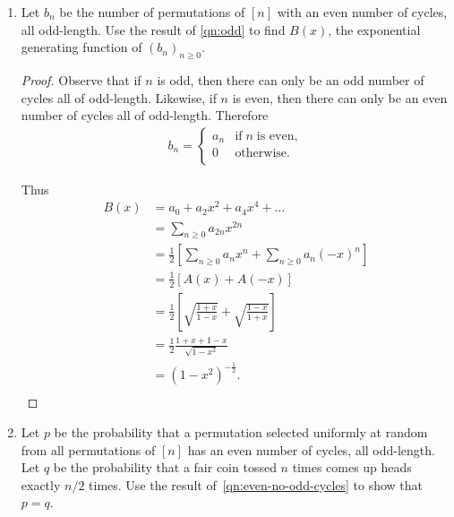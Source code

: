 \documentclass{article}
\begin{document}
\begin{enumerate}[label={(\alph*)}]
\begin{proof}
        Then
        \[A(x) =\exp{\left(C(x)\right)}
        =\exp{\left(\ln{\sqrt{\frac{1+x}{1-x}}}\right)}
        =\sqrt{\frac{1+x}{1-x}}.\]
      \end{proof}

    \item \label{qn:even-no-odd-cycles}
      Let $b_n$ be the number of permutations of $[n]$ with an even
      number of cycles, all odd-length. Use the result of
      \ref{qn:odd} to find $B(x)$, the exponential generating function
      of $(b_n)_{n\geq0}$.

      \begin{proof}
        Observe that if $n$ is odd, then there can only be an odd number
        of cycles all of odd-length. Likewise, if $n$ is even, then there
        can only be an even number of cycles all of odd-length. Therefore
        \begin{align*}
          b_n =
          \begin{cases}
            a_n &\text{if}\; n\; \text{is even},\\
            0 &\text{otherwise}.\\
          \end{cases}
        \end{align*}

        Thus
        \begin{align*}
          B(x) &=a_0+a_2x^2+a_4x^4+\ldots\\
          &=\sum_{n\geq0} a_{2n}x^{2n}\\
          &=\frac{1}{2} \left[\sum_{n\geq0} a_{n}x^{n} + \sum_{n\geq0}
            a_{n}(-x)^{n}\right]\\
          &=\frac{1}{2} \left[A(x) + A(-x)\right]\\
          &=\frac{1}{2} \left[\sqrt{\frac{1+x}{1-x}} +
            \sqrt{\frac{1-x}{1+x}}\right]\\
          &=\frac{1}{2} \frac{1+x+1-x}{\sqrt{1-x^2}}\\
          &=(1-x^2)^{-\frac{1}{2}}.\\
        \end{align*}
      \end{proof}

    \item Let $p$ be the probability that a permutation selected
      uniformly at random from all permutations of $[n]$ has an even
      number of cycles, all odd-length. Let $q$ be the probability that a
      fair coin tossed $n$ times comes up heads exactly $n/2$ times. Use
      the result of~\ref{qn:even-no-odd-cycles} to show that $p=q$.


\end{enumerate}
\end{document}
